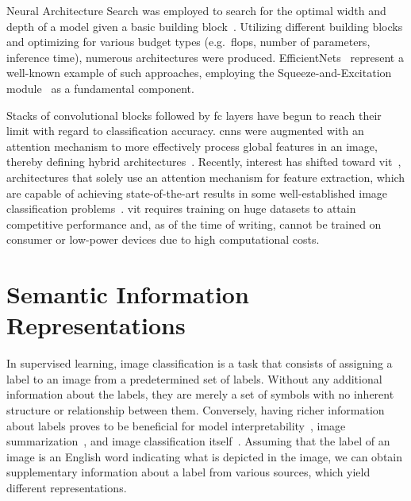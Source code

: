 Neural Architecture Search was employed to search for the optimal width and depth of a model given a basic building block~\cite{ProgressiveNeuLiuC2017, GeneticCnnXieL2017, LargeScaleEvoReal2017, RegularizedEvoReal2018}. Utilizing different building blocks and optimizing for various budget types (e.g.~\acrshort{flops}, number of parameters, inference time), numerous architectures were produced.
EfficientNets~\cite{EfficientnetRTanM2019, Efficientnetv2TanM2021} represent a well-known example of such approaches, employing the Squeeze-and-Excitation module~\cite{SqueezeAndExcHuJi2017} as a fundamental component.

Stacks of convolutional blocks followed by \acrfull{fc} layers have begun to reach their limit with regard to classification accuracy. \acrshort{cnn}s were augmented with an attention mechanism to more effectively process global features in an image, thereby defining hybrid architectures~\cite{SpatialTransfoJaderb2015, LookAndThinkCaoC2015, ShowAttendAnXuKe2015, ScaCnnSpatiaChen2016}.
Recently, interest has shifted toward \acrfull{vit}~\cite{AnImageIsWorDosovi2020}, architectures that solely use an attention mechanism for feature extraction, which are capable of achieving state-of-the-art results in some well-established image classification problems~\cite{TransformersInKhan2021, ASurveyOnVisHanK2023}. \acrshort{vit} requires training on huge datasets to attain competitive performance and, as of the time of writing, cannot be trained on consumer or low-power devices due to high computational costs.

\section{Semantic Information Representations}
\label{sec:semantic-information-sources}

In supervised learning, image classification is a task that consists of assigning a label to an image from a predetermined set of labels.
Without any additional information about the labels, they are merely a set of symbols with no inherent structure or relationship between them.
Conversely, having richer information about labels proves to be beneficial for model interpretability~\cite{ImprovingInterDong2017}, image summarization~\cite{SemanticImagePasini2022}, and image classification itself~\cite{MakingBetterMBertin2019}. Assuming that the label of an image is an English word indicating what is depicted in the image, we can obtain supplementary information about a label from various sources, which yield different representations.

